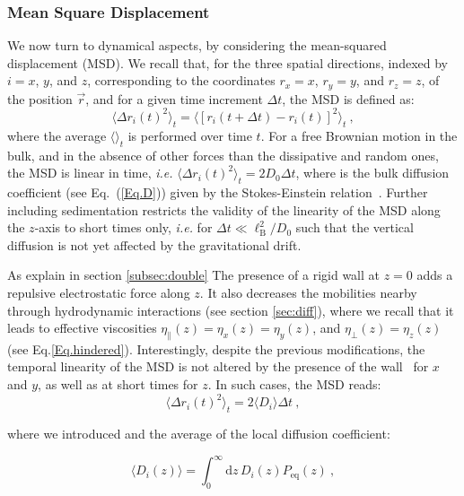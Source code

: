 \subsubsection{Mean Square Displacement}

We now turn to dynamical aspects, by considering the mean-squared displacement (MSD). We recall that, for the three spatial directions, indexed by $i=x$, $y$, and $z$, corresponding to the coordinates $r_x=x$, $r_y=y$, and $r_z=z$, of the position $\vec{r}$, and for a given time increment $\Delta t$, the MSD is defined as:
\begin{equation}
	\langle\Delta r_i(t)^2 \rangle_t = \langle[r_i(t+\Delta t) - r_i(t)]^2\rangle_t\ ,
	\label{MSDdef}
\end{equation}
where the average $\langle\rangle_t$ is performed over time $t$. For a free Brownian motion in the bulk, and in the absence of other forces than the dissipative and random ones, the \gls{MSD} is linear in time, \textit{i.e.} $\langle\Delta r_i(t)^2 \rangle_t = 2 D_0 \Delta t$, where is the bulk diffusion coefficient (see Eq.~(\ref{Eq.D})) given by the Stokes-Einstein relation~\cite{einstein_uber_1905}. Further including sedimentation restricts the validity of the linearity of the \gls{MSD} along the $z$-axis to short times only, \textit{i.e.} for $\Delta t\ll\ell_{\textrm{B}}^2/D_0$ such that the vertical diffusion is not yet affected by the gravitational drift.

As explain in section \ref{subsec:double} The presence of a rigid wall at $z=0$ adds a repulsive electrostatic force along $z$. It also decreases the mobilities nearby through hydrodynamic interactions (see section \ref{sec:diff}), where we recall that it leads to effective viscosities $\eta_\parallel(z)=\eta_x(z)=\eta_y(z)$, and $\eta_\bot(z) = \eta_z(z)$ (see Eq.\ref{Eq.hindered}). Interestingly, despite the previous modifications, the temporal linearity of the MSD is not altered by the presence of the wall~\cite{chubynsky_diffusing_2014,prieve_measurement_1999} for $x$ and $y$, as well as at short times for $z$. In such cases, the MSD reads:
\begin{equation}
	\langle\Delta r_i(t)^2 \rangle_t = 2 \langle D_i \rangle \Delta t\ ,
	\label{averagediff}
\end{equation}

where we introduced and the average of the local diffusion coefficient:

\begin{equation}
	\langle D_i(z) \rangle = \int_0^{\infty} \textrm{d}z\, D_i(z)P_{\textrm{eq}}(z) ~,
\end{equation}  

